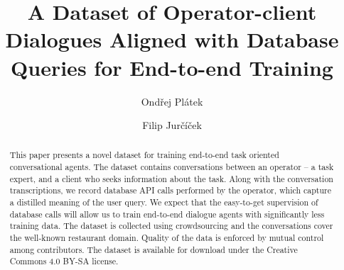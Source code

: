 \documentclass[runningheads,a4paper]{llncs}
\def\OP#1{#1}  %
\begin{document}


\title{A Dataset of Operator-client Dialogues Aligned with Database Queries for End-to-end Training}

\author{Ondřej Plátek \and Filip Jurčíček}

			
\maketitle

\begin{abstract}
This paper presents a novel dataset for training end-to-end task oriented conversational agents.
The dataset contains conversations between an operator – a task expert, and a client who seeks information about the task.
Along with the conversation transcriptions, we record database API calls performed by the operator, which capture a distilled meaning of the user query.
We expect that the easy-to-get supervision of database calls will allow us to train end-to-end dialogue agents with significantly less training data.
The dataset is collected using crowdsourcing and the conversations cover the well-known restaurant domain.
Quality of the data is enforced by mutual control among contributors.  
The dataset is available for download under the Creative Commons 4.0 BY-SA license.
\end{abstract}

\vspace{-1.00em}
\vspace{-1.00em}
\end{document}
